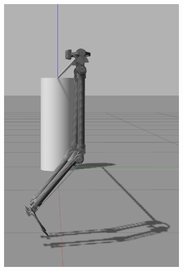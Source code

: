 \begin{figure}[h]
\begin{subfigure}{.19\textwidth}
    \includegraphics[width=\linewidth]{figures/gazebo_jumping_3.png}
  \end{subfigure}
  \begin{subfigure}{.19\textwidth}

\end{subfigure}
\end{figure}
